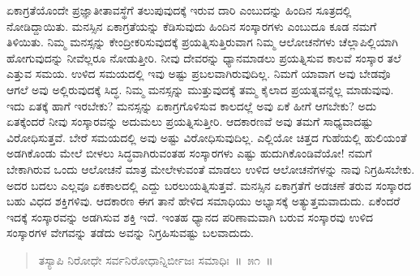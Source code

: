 \vspace{-0.6cm}


\vspace{0.2cm}

ಏಕಾಗ್ರತೆಯೊಂದೇ ಪ್ರಜ್ಞಾತೀತಾವಸ್ಥೆಗೆ ತಲುಪುವುದಕ್ಕೆ ಇರುವ ದಾರಿ ಎಂಬುದನ್ನು ಹಿಂದಿನ ಸೂತ್ರದಲ್ಲಿ ನೋಡಿದ್ದಾಯಿತು. ಮನಸ್ಸಿನ ಏಕಾಗ್ರತೆಯನ್ನು ಕೆಡಿಸುವುದು ಹಿಂದಿನ ಸಂಸ್ಕಾರಗಳು ಎಂಬುದೂ ಕೂಡ ನಮಗೆ ತಿಳಿಯಿತು. ನಿಮ್ಮ ಮನಸ್ಸನ್ನು ಕೇಂದ್ರೀಕರಿಸುವುದಕ್ಕೆ ಪ್ರಯತ್ನಿಸುತ್ತಿರುವಾಗ ನಿಮ್ಮ ಆಲೋಚನೆಗಳು ಚೆಲ್ಲಾಪಿಲ್ಲಿಯಾಗಿ ಹೋಗುವುದನ್ನು ನೀವೆಲ್ಲರೂ ನೋಡುತ್ತೀರಿ. ನೀವು ದೇವರನ್ನು ಧ್ಯಾನಮಾಡಲು ಪ್ರಯತ್ನಿಸುವ ಕಾಲವೆ ಸಂಸ್ಕಾರ ತಲೆ ಎತ್ತುವ ಸಮಯ. ಉಳಿದ ಸಮಯದಲ್ಲಿ ಇವು ಅಷ್ಟು ಪ್ರಬಲವಾಗಿರುವುದಿಲ್ಲ. ನಿಮಗೆ ಯಾವಾಗ ಅವು ಬೇಡವೊ ಆಗಲೆ ಅವು ಅಲ್ಲಿರುವುದಕ್ಕೆ ಸಿದ್ಧ. ನಿಮ್ಮ ಮನಸ್ಸನ್ನು ಮುತ್ತುವುದಕ್ಕೆ ತಮ್ಮ ಕೈಲಾದ ಪ್ರಯತ್ನವನ್ನೆಲ್ಲ ಮಾಡುವುವು. ಇದು ಏತಕ್ಕೆ ಹಾಗೆ ಇರಬೇಕು? ಮನಸ್ಸನ್ನು ಏಕಾಗ್ರಗೊಳಿಸುವ ಕಾಲದಲ್ಲೆ ಅವು ಏಕೆ ಹೀಗೆ ಆಗಬೇಕು? ಅದು ಏತಕ್ಕೆಂದರೆ ನೀವು ಸಂಸ್ಕಾರವನ್ನು ಅದುಮಲು ಪ್ರಯತ್ನಿಸುತ್ತೀರಿ. ಆದಕಾರಣವೆ ಅವು ತಮಗೆ ಸಾಧ್ಯವಾದಷ್ಟು ವಿರೋಧಿಸುತ್ತವೆ. ಬೇರೆ ಸಮಯದಲ್ಲಿ ಅವು ಅಷ್ಟು ವಿರೋಧಿಸುವುದಿಲ್ಲ. ಎಲ್ಲಿಯೋ ಚಿತ್ತದ ಗುಹೆಯಲ್ಲಿ ಹುಲಿಯಂತೆ ಅಡಗಿಕೊಂಡು ಮೇಲೆ ಬೀಳಲು ಸಿದ್ಧವಾಗಿರುವಂತಹ ಸಂಸ್ಕಾರಗಳು ಎಷ್ಟು ಹುದುಗಿಕೊಂಡಿವೆಯೋ! ನಮಗೆ ಬೇಕಾಗಿರುವ ಒಂದು ಆಲೋಚನೆ ಮಾತ್ರ ಮೇಲೇಳುವಂತೆ ಮಾಡಲು ಉಳಿದ ಆಲೋಚನೆಗಳನ್ನು ನಾವು ನಿಗ್ರಹಿಸಬೇಕು. ಅದರ ಬದಲು ಎಲ್ಲವೂ ಏಕಕಾಲದಲ್ಲಿ ಎದ್ದು ಬರಲು\break ಯತ್ನಿಸುತ್ತವೆ. ಮನಸ್ಸಿನ ಏಕಾಗ್ರತೆಗೆ ಅಡಚಣೆ ತರುವ ಸಂಸ್ಕಾರದ ಬಹು ವಿಧದ ಶಕ್ತಿಗಳಿವು. ಆದಕಾರಣ ಈಗ ತಾನೆ ಹೇಳಿದ ಸಮಾಧಿಯು ಅಭ್ಯಾಸಕ್ಕೆ ಅತ್ಯುತ್ತಮವಾದುದು. ಏಕೆಂದರೆ ಇದಕ್ಕೆ ಸಂಸ್ಕಾರವನ್ನು ಅಡಗಿಸುವ ಶಕ್ತಿ ಇದೆ. ಇಂತಹ ಧ್ಯಾನದ ಪರಿಣಾಮವಾಗಿ ಬರುವ ಸಂಸ್ಕಾರವು ಉಳಿದ ಸಂಸ್ಕಾರಗಳ ವೇಗವನ್ನು ತಡೆದು ಅವನ್ನು ನಿಗ್ರಹಿಸುವಷ್ಟು ಬಲವಾದುದು. 

\vspace{-0.25cm}

\begin{verse}
ತಸ್ಯಾಪಿ ನಿರೋಧೇ ಸರ್ವನಿರೋಧಾನ್ನಿರ್ಬೀಜಃ ಸಮಾಧಿಃ~॥~೫೧~॥
\end{verse}

\vspace{-0.42cm}


\vspace{0.2cm}

